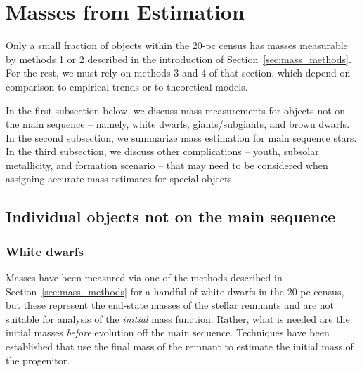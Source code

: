 \documentclass[twocolumn,tighten,twocolappendix]{aastex631}
\begin{document}
\section{Masses from Estimation\label{sec:mass_estimates}}

Only a small fraction of objects within the 20-pc census has masses measurable by methods 1 or 2 described in the introduction of Section~\ref{sec:mass_methods}. For the rest, we must rely on methods 3 and 4 of that section, which depend on comparison to empirical trends or to theoretical models.

In the first subsection below, we discuss mass measurements for objects not on the main sequence -- namely, white dwarfs, giants/subgiants, and brown dwarfs. In the second subsection, we summarize mass estimation for main sequence stars. In the third subsection, we discuss other complications -- youth, subsolar metallicity, and formation scenario -- that may need to be considered when assigning accurate mass estimates for special objects.

\subsection{Individual objects not on the main sequence}

\subsubsection{White dwarfs\label{sec:wd_masses}}

Masses have been measured via one of the methods described in Section~\ref{sec:mass_methods} for a handful of white dwarfs in the 20-pc census, but %
these represent the end-state masses of the stellar remnants and are not suitable for analysis of the {\it initial} mass function.
Rather, what is needed are the initial masses {\it before} evolution off the main sequence. Techniques have been established that use the final mass of the remnant to estimate the initial mass of the progenitor.
\end{document}
